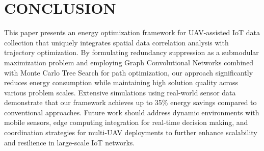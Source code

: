 \documentclass[sigconf]{acmart}
\begin{document}
\section{CONCLUSION}
This paper presents an energy optimization framework for UAV-assisted IoT data collection that uniquely integrates spatial data correlation analysis with trajectory optimization. By formulating redundancy suppression as a submodular maximization problem and employing Graph Convolutional Networks combined with Monte Carlo Tree Search for path optimization, our approach significantly reduces energy consumption while maintaining high solution quality across various problem scales. Extensive simulations using real-world sensor data demonstrate that our framework achieves up to 35\% energy savings compared to conventional approaches. Future work should address dynamic environments with mobile sensors, edge computing integration for real-time decision making, and coordination strategies for multi-UAV deployments to further enhance scalability and resilience in large-scale IoT networks.



\end{document}
